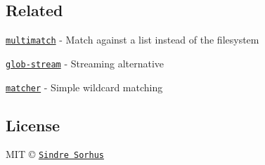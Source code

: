 \subsection*{Related}


\begin{DoxyItemize}
\item \href{https://github.com/sindresorhus/multimatch}{\tt multimatch} -\/ Match against a list instead of the filesystem
\item \href{https://github.com/wearefractal/glob-stream}{\tt glob-\/stream} -\/ Streaming alternative
\item \href{https://github.com/sindresorhus/matcher}{\tt matcher} -\/ Simple wildcard matching
\end{DoxyItemize}

\subsection*{License}

M\+IT © \href{https://sindresorhus.com}{\tt Sindre Sorhus} 